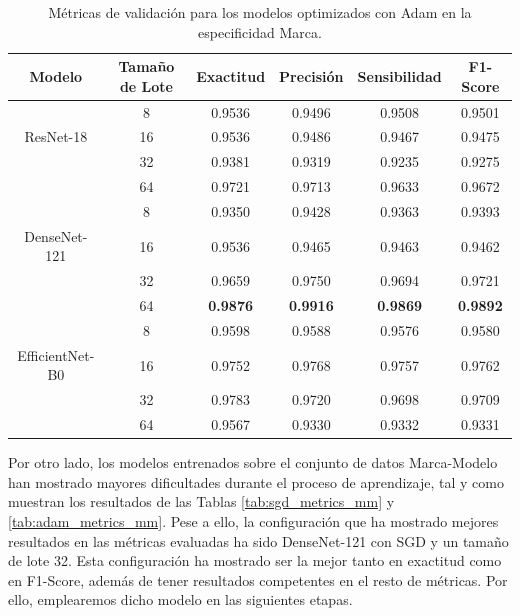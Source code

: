 \begin{table}[H]
	\begin{adjustbox}{width=1\textwidth}
		\begin{tabular}{|c|c|c|c|c|c|}
			\hline
			\textbf{Modelo} & \textbf{Tamaño de Lote} & \textbf{Exactitud} & \textbf{Precisión} & \textbf{Sensibilidad} & \textbf{F1-Score} \\
			\hline
			 & 8 & 0.9536 & 0.9496 & 0.9508 & 0.9501 \\ \cline{2-6}
			ResNet-18 & 16 & 0.9536 & 0.9486 & 0.9467 & 0.9475 \\ \cline{2-6}
			& 32 & 0.9381 & 0.9319 & 0.9235 & 0.9275 \\ \cline{2-6}
			& 64 & 0.9721 & 0.9713 & 0.9633 & 0.9672 \\
			\hline
			 & 8 & 0.9350 & 0.9428 & 0.9363 & 0.9393 \\ \cline{2-6}
			DenseNet-121 & 16 & 0.9536 & 0.9465 & 0.9463 & 0.9462 \\ \cline{2-6}
			 & 32 & 0.9659 & 0.9750 & 0.9694 & 0.9721 \\ \cline{2-6}
			 & 64 & \textbf{0.9876} & \textbf{0.9916} & \textbf{0.9869} & \textbf{0.9892} \\
			\hline
			 & 8 & 0.9598 & 0.9588 & 0.9576 & 0.9580 \\ \cline{2-6}
			EfficientNet-B0 & 16 & 0.9752 & 0.9768 & 0.9757 & 0.9762 \\ \cline{2-6}
			 & 32 & 0.9783 & 0.9720 & 0.9698 & 0.9709 \\ \cline{2-6}
			 & 64 & 0.9567 & 0.9330 & 0.9332 & 0.9331 \\
			\hline
		\end{tabular}
	\end{adjustbox}
	\caption{Métricas de validación para los modelos optimizados con Adam en la especificidad Marca.}
	\label{tab:adam_metrics-marca}
\end{table}

Por otro lado, los modelos entrenados sobre el conjunto de datos Marca-Modelo han mostrado mayores dificultades durante el proceso de aprendizaje, tal y como muestran los resultados de las Tablas \ref{tab:sgd_metrics_mm} y \ref{tab:adam_metrics_mm}. Pese a ello, la configuración que ha mostrado mejores resultados en las métricas evaluadas ha sido DenseNet-121 con SGD y un tamaño de lote 32. Esta configuración ha mostrado ser la mejor tanto en exactitud como en F1-Score, además de tener resultados competentes en el resto de métricas. Por ello, emplearemos dicho modelo en las siguientes etapas.

